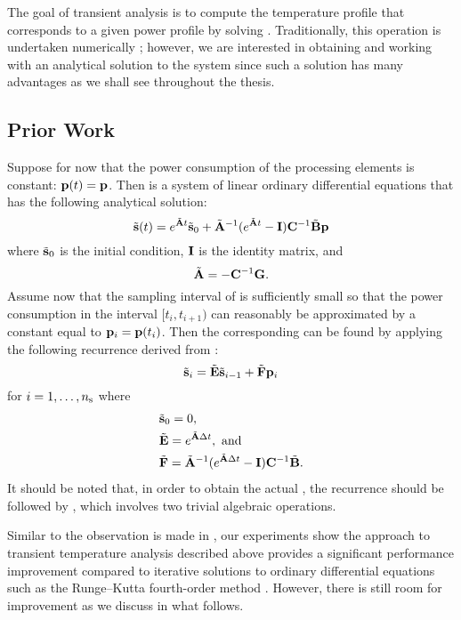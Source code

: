 The goal of transient analysis is to compute the temperature profile \mq that
corresponds to a given power profile \mp by solving
. Traditionally, this operation is undertaken
numerically \cite{skadron2003}; however, we are interested in obtaining and
working with an analytical solution to the system since such a solution has many
advantages as we shall see throughout the thesis.

\subsection{Prior Work}

Suppose for now that the power consumption of the processing elements is
constant: $\mathbf{p}(t) = \mathbf{p}$. Then  is a
system of linear ordinary differential equations that has the following
analytical solution:
\begin{equation} \elab{solution-original}
  \tvs(t) = e^{\tm{A} t} \tvs_0 + \tm{A}^{-1} (e^{\tm{A} t} - \m{I}) \m{C}^{-1} \tm{B} \vp
\end{equation}
where $\tilde{\mathbf{s}}_0$ is the initial condition, $\mathbf{I}$ is the identity matrix, and
\[
  \tilde{\mathbf{A}} = -\mathbf{C}^{-1} \mathbf{G}.
\]
Assume now that the sampling interval \dt of \mp is sufficiently small so that
the power consumption in the interval $[t_i, t_{i + 1})$ can reasonably be
approximated by a constant equal to $\mathbf{p}_i = \mathbf{p}(t_i)$. Then the corresponding
\mq can be found by applying the following recurrence derived from
:
\begin{equation} \elab{recurrence-original}
  \tvs_{i} = \tm{E} \tvs_{i - 1} + \tm{F} \vp_i
\end{equation}
for $i = 1, \dots, {n_\mathrm{s}}$ where
\begin{align*}
  & \tilde{\mathbf{s}}_0 = 0, \\
  & \tilde{\mathbf{E}} = e^{\tilde{\mathbf{A}} \Delta t}, \text{ and} \\
  & \tilde{\mathbf{F}} = \tilde{\mathbf{A}}^{-1}(e^{\tilde{\mathbf{A}} \Delta t} - \mathbf{I})\mathbf{C}^{-1} \tilde{\mathbf{B}}.
\end{align*}
It should be noted that, in order to obtain the actual \mq, the recurrence
should be followed by , which involves two
trivial algebraic operations.

Similar to the observation is made in \cite{thiele2011}, our experiments show
the approach to transient temperature analysis described above provides a
significant performance improvement compared to iterative solutions to ordinary
differential equations such as the Runge--Kutta fourth-order method
\cite{press2007}. However, there is still room for improvement as we discuss in
what follows.

